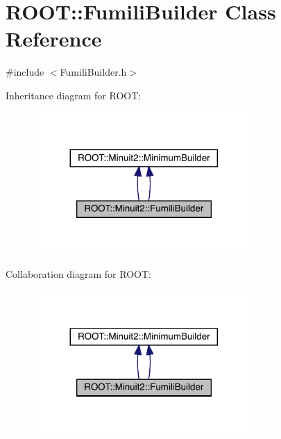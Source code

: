 \hypertarget{classROOT_1_1Minuit2_1_1FumiliBuilder}{}\section{R\+O\+OT\+:\+:Fumili\+Builder Class Reference}
\label{classROOT_1_1Minuit2_1_1FumiliBuilder}


{\ttfamily \#include $<$Fumili\+Builder.\+h$>$}



Inheritance diagram for R\+O\+OT\+:\nopagebreak
\begin{figure}[H]
\begin{center}
\leavevmode
\includegraphics[width=239pt]{dc/d0a/classROOT_1_1Minuit2_1_1FumiliBuilder__inherit__graph}
\end{center}
\end{figure}


Collaboration diagram for R\+O\+OT\+:\nopagebreak
\begin{figure}[H]
\begin{center}
\leavevmode
\includegraphics[width=239pt]{d2/d6e/classROOT_1_1Minuit2_1_1FumiliBuilder__coll__graph}
\end{center}
\end{figure}
